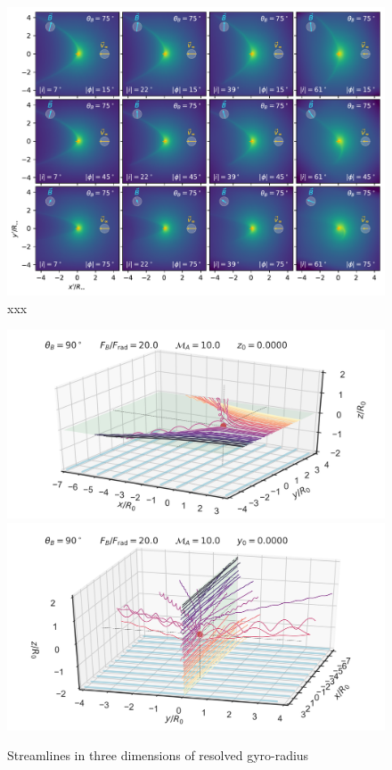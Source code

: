 \begin{figure}
  \includegraphics[width=\linewidth]{figs/multi-view-dust-bfield-75}
  \caption{xxx}
  \label{fig:projected-magnetic-dust-waves-75}
\end{figure}


\begin{figure}
  \includegraphics[width=\linewidth]{figs/dust-lorentz-stream-3d-turb-b90-L2000-Ma0100-Z+000}
  \includegraphics[width=\linewidth]{figs/dust-lorentz-stream-3d-turbz-b90-L2000-Ma0100-Y+000}
  \caption{Streamlines in three dimensions of resolved gyro-radius }
  \label{fig:stream-3d}
\end{figure}

